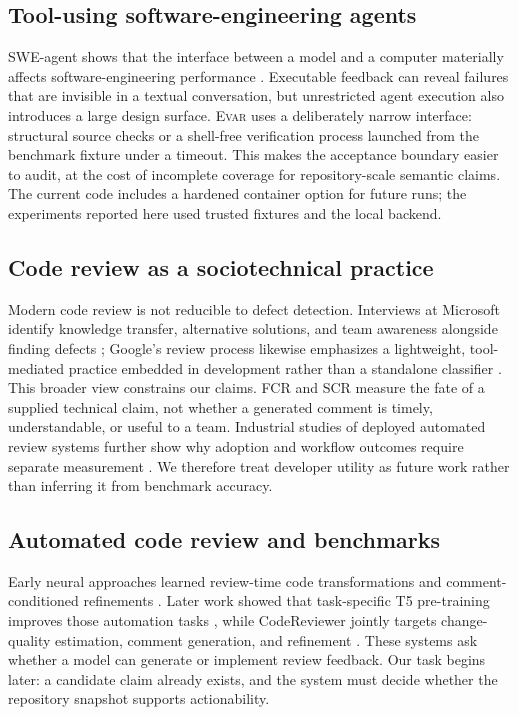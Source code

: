 \documentclass[acmsmall,screen,review,anonymous]{acmart}
\newcommand{\evar}{\textsc{Evar}\xspace}
\begin{document}
\subsection{Tool-using software-engineering agents}

SWE-agent shows that the interface between a model and a computer materially affects software-engineering performance \cite{sweagent}. Executable feedback can reveal failures that are invisible in a textual conversation, but unrestricted agent execution also introduces a large design surface. \evar uses a deliberately narrow interface: structural source checks or a shell-free verification process launched from the benchmark fixture under a timeout. This makes the acceptance boundary easier to audit, at the cost of incomplete coverage for repository-scale semantic claims. The current code includes a hardened container option for future runs; the experiments reported here used trusted fixtures and the local backend.

\subsection{Code review as a sociotechnical practice}

Modern code review is not reducible to defect detection. Interviews at Microsoft identify knowledge transfer, alternative solutions, and team awareness alongside finding defects \cite{bacchelli-bird}; Google's review process likewise emphasizes a lightweight, tool-mediated practice embedded in development rather than a standalone classifier \cite{sadowski}. This broader view constrains our claims. FCR and SCR measure the fate of a supplied technical claim, not whether a generated comment is timely, understandable, or useful to a team. Industrial studies of deployed automated review systems further show why adoption and workflow outcomes require separate measurement \cite{automated-practice,rovodev}. We therefore treat developer utility as future work rather than inferring it from benchmark accuracy.

\subsection{Automated code review and benchmarks}

Early neural approaches learned review-time code transformations and comment-conditioned refinements \cite{tufano-automating}. Later work showed that task-specific T5 pre-training improves those automation tasks \cite{tufano-pretrained}, while CodeReviewer jointly targets change-quality estimation, comment generation, and refinement \cite{codereviewer}. These systems ask whether a model can generate or implement review feedback. Our task begins later: a candidate claim already exists, and the system must decide whether the repository snapshot supports actionability.
\end{document}
